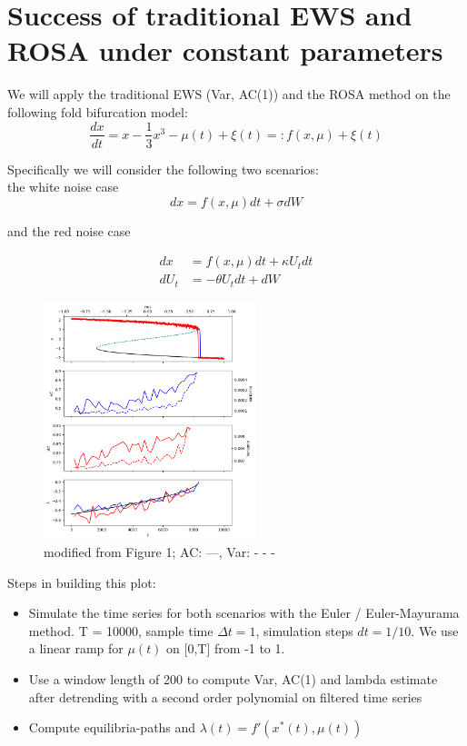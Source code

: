 \documentclass[%
thesis=student,%
coverpage=false,%
titlepage=false,%
headmarks=true, %
german,%
font=libertine, %
math=newpxtx, %
BCOR=5mm,%
coverBCOR=11mm%
]{tumbook}
\begin{document}
\chapter{Success of traditional EWS and ROSA under constant parameters}

We will apply the traditional EWS (Var, AC(1)) and the ROSA method on the following fold bifurcation model: 
        \[
            \frac{dx}{dt} = x - \frac{1}{3}x^3 - \mu(t) + \xi(t) =: f(x,\mu) + \xi(t)
        \]

Specifically we will consider the following two scenarios: \\
    the white noise case
    \[
    dx = f(x,\mu)dt + \sigma dW
    \]

and the red noise case
    
    \begin{align*}   
    dx & = f(x,\mu)dt + \kappa U_{t}dt \\
    dU_{t} & = -\theta U_{t} dt + dW
    \end{align*}


\begin{figure}
    \centering
    \includegraphics[width=0.55\textwidth]{figures/21_6_fig1_ls_without_conv.png}
    \caption{modified from \cite{Clarke:2023} Figure 1; AC: ---, Var: - - -}
\end{figure}


Steps in building this plot:
    \begin{itemize}
        \item Simulate the time series for both scenarios with the Euler / Euler-Mayurama method. T = 10000, sample time $\Delta t = 1$, simulation steps $dt = 1/10$. We use a linear ramp for $\mu(t)$ on [0,T] from -1 to 1.
    
        \item Use a window length of 200 to compute Var, AC(1) and lambda estimate after detrending with a second order polynomial on filtered time series
        
        \item Compute equilibria-paths and $\lambda (t) = f'(x^{*}(t),\mu(t))$
    \end{itemize}
\end{document}

